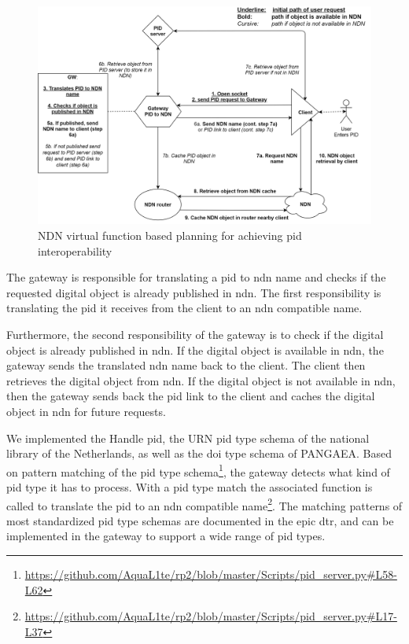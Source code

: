 \documentclass[conference]{IEEEtran}
\begin{document}

\begin{figure}[H]
\centering
\includegraphics[width=\columnwidth]{images/PIDtoNDN.png}
\caption{NDN virtual function based planning for achieving \gls{pid} interoperability}
\label{fig:sdc_model}
\end{figure}

The gateway is responsible for translating a \gls{pid} to \gls{ndn} name and checks if the requested digital object is already published in \gls{ndn}. The first responsibility is translating the \gls{pid} it receives from the client to an \gls{ndn} compatible name. 

Furthermore, the second responsibility of the gateway is to check if the digital object is already published in \gls{ndn}. If the digital object is available in \gls{ndn}, the gateway sends the translated \gls{ndn} name back to the client. The client then retrieves the digital object from \gls{ndn}. If the digital object is not available in \gls{ndn}, then the gateway sends back the \gls{pid} link to the client and caches the digital object in \gls{ndn} for future requests.

We implemented the Handle \gls{pid}, the URN \gls{pid} type schema of the national library of the Netherlands, as well as the \gls{doi} type schema of PANGAEA. Based on pattern matching of the \gls{pid} type schema\footnote{\url{https://github.com/AquaL1te/rp2/blob/master/Scripts/pid_server.py#L58-L62}}, the gateway detects what kind of \gls{pid} type it has to process. With a \gls{pid} type match the associated function is called to translate the \gls{pid} to an \gls{ndn} compatible name\footnote{\url{https://github.com/AquaL1te/rp2/blob/master/Scripts/pid_server.py#L17-L37}}. The matching patterns of most standardized \gls{pid} type schemas are documented in the \gls{epic} \gls{dtr}, and can be implemented in the gateway \cite{dtr} to support a wide range of \gls{pid} types. 
\end{document}
